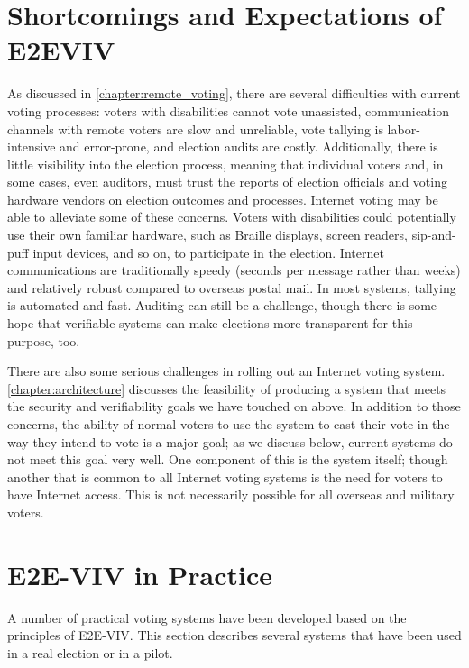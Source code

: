 \section{Shortcomings and Expectations of E2EVIV}
As discussed in \autoref{chapter:remote_voting}, there are several
difficulties with current voting processes: voters with disabilities cannot
vote unassisted, communication channels with remote voters are slow and
unreliable, vote tallying is labor-intensive and error-prone, and
election audits are costly. Additionally, there is little visibility into
the election process, meaning that individual voters and, in some cases,
even auditors, must trust the reports of election officials and voting
hardware vendors on election outcomes and processes. Internet voting may be
able to alleviate some of these concerns. Voters with disabilities could
potentially use their own familiar hardware, such as Braille displays,
screen readers, sip-and-puff input devices, and so on, to participate in the
election. Internet communications are traditionally speedy (seconds per
message rather than weeks) and relatively robust compared to overseas postal
mail. In most systems, tallying is automated and fast. Auditing can still be
a challenge, though there is some hope that verifiable systems can make
elections more transparent for this purpose, too.

There are also some serious challenges in rolling out an Internet voting
system. \autoref{chapter:architecture} discusses the feasibility of
producing a system that meets the security and verifiability goals we have
touched on above. In addition to those concerns, the ability of normal
voters to use the system to cast their vote in the way they intend to vote
is a major goal; as we discuss below, current systems do not meet this goal
very well. One component of this is the system itself; though another that
is common to all Internet voting systems is the need for voters to have
Internet access. This is not necessarily possible for all overseas and
military voters.

\section{E2E-VIV in Practice}

A number of practical voting systems have been developed based on the
principles of E2E-VIV. This section describes several systems that
have been used in a real election or in a pilot.

